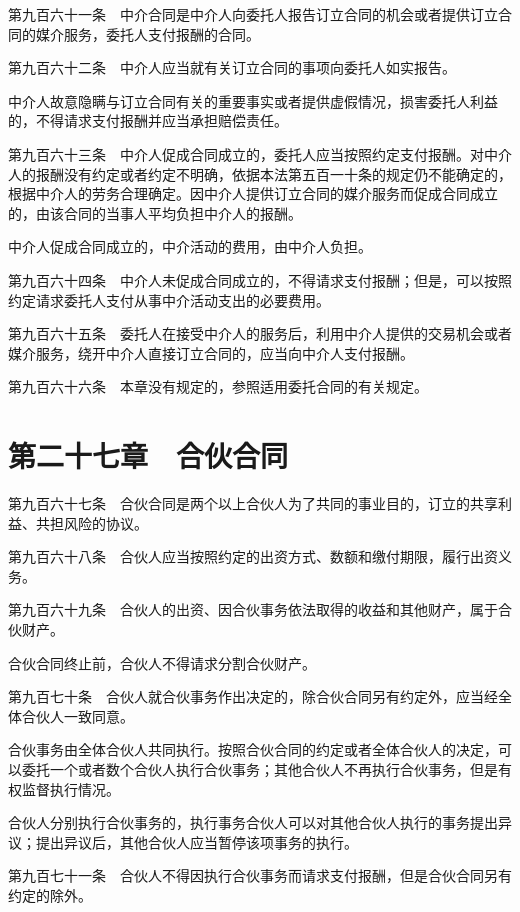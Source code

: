 \documentclass[UTF8,12pt,a4paper]{ctexbook}
\begin{document}
第九百六十一条　中介合同是中介人向委托人报告订立合同的机会或者提供订立合同的媒介服务，委托人支付报酬的合同。

第九百六十二条　中介人应当就有关订立合同的事项向委托人如实报告。

中介人故意隐瞒与订立合同有关的重要事实或者提供虚假情况，损害委托人利益的，不得请求支付报酬并应当承担赔偿责任。

第九百六十三条　中介人促成合同成立的，委托人应当按照约定支付报酬。对中介人的报酬没有约定或者约定不明确，依据本法第五百一十条的规定仍不能确定的，根据中介人的劳务合理确定。因中介人提供订立合同的媒介服务而促成合同成立的，由该合同的当事人平均负担中介人的报酬。

中介人促成合同成立的，中介活动的费用，由中介人负担。

第九百六十四条　中介人未促成合同成立的，不得请求支付报酬；但是，可以按照约定请求委托人支付从事中介活动支出的必要费用。

第九百六十五条　委托人在接受中介人的服务后，利用中介人提供的交易机会或者媒介服务，绕开中介人直接订立合同的，应当向中介人支付报酬。

第九百六十六条　本章没有规定的，参照适用委托合同的有关规定。

\section*{第二十七章　合伙合同}

第九百六十七条　合伙合同是两个以上合伙人为了共同的事业目的，订立的共享利益、共担风险的协议。

第九百六十八条　合伙人应当按照约定的出资方式、数额和缴付期限，履行出资义务。

第九百六十九条　合伙人的出资、因合伙事务依法取得的收益和其他财产，属于合伙财产。

合伙合同终止前，合伙人不得请求分割合伙财产。

第九百七十条　合伙人就合伙事务作出决定的，除合伙合同另有约定外，应当经全体合伙人一致同意。

合伙事务由全体合伙人共同执行。按照合伙合同的约定或者全体合伙人的决定，可以委托一个或者数个合伙人执行合伙事务；其他合伙人不再执行合伙事务，但是有权监督执行情况。

合伙人分别执行合伙事务的，执行事务合伙人可以对其他合伙人执行的事务提出异议；提出异议后，其他合伙人应当暂停该项事务的执行。

第九百七十一条　合伙人不得因执行合伙事务而请求支付报酬，但是合伙合同另有约定的除外。
\end{document}
